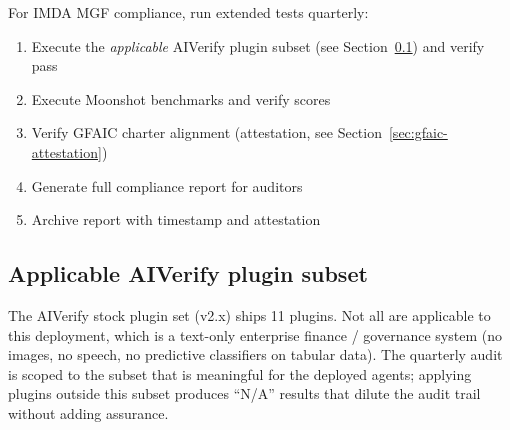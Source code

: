 \documentclass[11pt,a4paper,twoside]{report}
\begin{document}
For IMDA MGF compliance, run extended tests quarterly:

\begin{enumerate}
\item Execute the \emph{applicable} AIVerify plugin subset
(see Section~\ref{sec:aiverify-subset}) and verify pass
\item Execute Moonshot benchmarks and verify scores
\item Verify GFAIC charter alignment (attestation, see
Section~\ref{sec:gfaic-attestation})
\item Generate full compliance report for auditors
\item Archive report with timestamp and attestation
\end{enumerate}

\subsection{Applicable AIVerify plugin subset}\label{sec:aiverify-subset}

The AIVerify stock plugin set (v2.x) ships 11 plugins. Not all are
applicable to this deployment, which is a text-only enterprise
finance / governance system (no images, no speech, no predictive
classifiers on tabular data). The quarterly audit is scoped to the
subset that is meaningful for the deployed agents; applying
plugins outside this subset produces ``N/A'' results that dilute
the audit trail without adding assurance.
\end{document}
